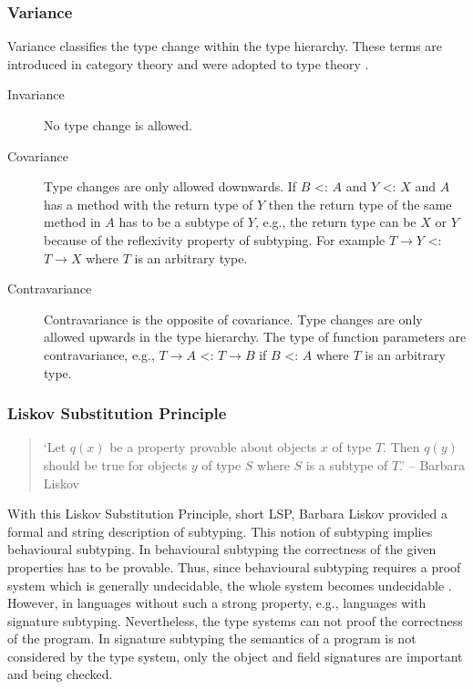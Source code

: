 \subsubsection{Variance}
Variance classifies the type change within the type hierarchy. These
terms are introduced in category theory and were adopted to type theory
\cite{pierce_basic_1991}.

\begin{description}
	\item[Invariance] No type change is allowed.
	\item[Covariance] Type changes are only allowed downwards. If $B$
	<: $A$ and $Y$ <: $X$ and $A$ has a method with the return
	type of $Y$ then the return type of the same method in $A$
	has to be a subtype of $Y$, e.g., the return type can be $X$
	or $Y$ because of the reflexivity property of subtyping. For
	example $T \rightarrow Y$ <: $T \rightarrow X$ where $T$ is an
	arbitrary type.
	\item[Contravariance] Contravariance is the opposite of
	covariance. Type changes are only allowed upwards in the type
	hierarchy. The type of function parameters are contravariance,
	e.g., $T \rightarrow A$ <: $T \rightarrow B$ if $B$ <: $A$ where
	$T$ is an arbitrary type.
\end{description}

\subsubsection{Liskov Substitution Principle}
\begin{quotation}
`Let $q(x)$ be a property provable about objects $x$ of type $T$. Then
$q(y)$ should be true for objects $y$ of type $S$ where $S$ is a subtype
of $T$.' -- Barbara Liskov \cite{liskov_behavioral_2001}
\end{quotation}

With this Liskov Substitution Principle, short LSP, Barbara Liskov
provided a formal and string description  of subtyping. This
notion of subtyping implies behavioural subtyping. In behavioural
subtyping the correctness of the given properties has to be
provable. Thus, since behavioural subtyping requires a proof system
which is generally undecidable, the whole system becomes undecidable
\cite{poll_behavioural_1998}. However, in languages without such a strong
property, e.g., languages with signature subtyping. Nevertheless, the
type systems can not proof the correctness of the program. In signature
subtyping the semantics of a program is not considered by the type system,
only the object and field signatures are important and being checked.

